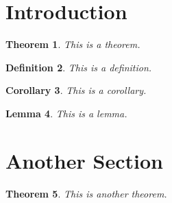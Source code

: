 \documentclass[a4paper]{article}
\newtheorem{theorem}{Theorem}[section]
\newtheorem{definition}[theorem]{Definition}
\newtheorem{corollary}[theorem]{Corollary}
\newtheorem{lemma}[theorem]{Lemma}
\begin{document}
    \section{Introduction}
    \begin{theorem}
        This is a theorem.
    \end{theorem}
    \begin{definition}
        This is a definition.
    \end{definition}
    \begin{corollary}
        This is a corollary.
    \end{corollary}
    \begin{lemma}
        This is a lemma.
    \end{lemma}

    \section{Another Section}
    \begin{theorem}
        This is another theorem.
    \end{theorem}
\end{document}
